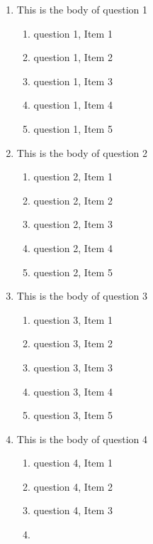 \documentclass{article}
\begin{document}
\begin{enumerate}

\item
This is the body of question 1
    \begin{enumerate}
    \item
    question 1, Item 1
    \item
    question 1, Item 2
    \item
    question 1, Item 3
    \item
    question 1, Item 4
    \item
    question 1, Item 5
    \end{enumerate}
\item
This is the body of question 2
    \begin{enumerate}
    \item
    question 2, Item 1
    \item
    question 2, Item 2
    \item
    question 2, Item 3
    \item
    question 2, Item 4
    \item
    question 2, Item 5
    \end{enumerate}
\item
This is the body of question 3
    \begin{enumerate}
    \item
    question 3, Item 1
    \item
    question 3, Item 2
    \item
    question 3, Item 3
    \item
    question 3, Item 4
    \item
    question 3, Item 5
    \end{enumerate}
\item
This is the body of question 4
    \begin{enumerate}
    \item
    question 4, Item 1
    \item
    question 4, Item 2
    \item
    question 4, Item 3
    \item

\end{enumerate}
\end{enumerate}
\end{document}
